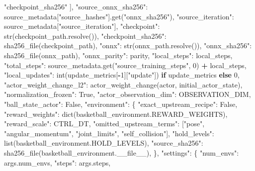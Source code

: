 \documentclass[
  chinese,
  11pt,
  letterpaper,
]{article}
\newenvironment{Shaded}{\begin{snugshade}}{\end{snugshade}}
\newcommand{\BuiltInTok}[1]{#1}
\newcommand{\ControlFlowTok}[1]{\textcolor[rgb]{0.13,0.29,0.53}{\textbf{#1}}}
\newcommand{\DecValTok}[1]{\textcolor[rgb]{0.00,0.00,0.81}{#1}}
\newcommand{\NormalTok}[1]{#1}
\newcommand{\OperatorTok}[1]{\textcolor[rgb]{0.81,0.36,0.00}{\textbf{#1}}}
\newcommand{\StringTok}[1]{\textcolor[rgb]{0.31,0.60,0.02}{#1}}
\newcommand{\VariableTok}[1]{\textcolor[rgb]{0.00,0.00,0.00}{#1}}
\renewenvironment{Shaded}{\par\smallskip}{\par\smallskip}
\begin{document}
\begin{Shaded}
\begin{Highlighting}[]
            \StringTok{"checkpoint\_sha256"}
\NormalTok{        ],}
        \StringTok{"source\_onnx\_sha256"}\NormalTok{: source\_metadata[}\StringTok{"source\_hashes"}\NormalTok{].get(}\StringTok{"onnx\_sha256"}\NormalTok{),}
        \StringTok{"source\_iteration"}\NormalTok{: source\_metadata[}\StringTok{"source\_iteration"}\NormalTok{],}
        \StringTok{"checkpoint"}\NormalTok{: }\BuiltInTok{str}\NormalTok{(checkpoint\_path.resolve()),}
        \StringTok{"checkpoint\_sha256"}\NormalTok{: sha256\_file(checkpoint\_path),}
        \StringTok{"onnx"}\NormalTok{: }\BuiltInTok{str}\NormalTok{(onnx\_path.resolve()),}
        \StringTok{"onnx\_sha256"}\NormalTok{: sha256\_file(onnx\_path),}
        \StringTok{"onnx\_parity"}\NormalTok{: parity,}
        \StringTok{"local\_steps"}\NormalTok{: local\_steps,}
        \StringTok{"total\_steps"}\NormalTok{: source\_metadata.get(}\StringTok{"source\_training\_steps"}\NormalTok{, }\DecValTok{0}\NormalTok{) }\OperatorTok{+}\NormalTok{ local\_steps,}
        \StringTok{"local\_updates"}\NormalTok{: }\BuiltInTok{int}\NormalTok{(update\_metrics[}\OperatorTok{{-}}\DecValTok{1}\NormalTok{][}\StringTok{"update"}\NormalTok{]) }\ControlFlowTok{if}\NormalTok{ update\_metrics }\ControlFlowTok{else} \DecValTok{0}\NormalTok{,}
        \StringTok{"actor\_weight\_change\_l2"}\NormalTok{: actor\_weight\_change(actor, initial\_actor\_state),}
        \StringTok{"normalization\_frozen"}\NormalTok{: }\VariableTok{True}\NormalTok{,}
        \StringTok{"actor\_observation\_dim"}\NormalTok{: OBSERVATION\_DIM,}
        \StringTok{"ball\_state\_actor"}\NormalTok{: }\VariableTok{False}\NormalTok{,}
        \StringTok{"environment"}\NormalTok{: \{}
            \StringTok{"exact\_upstream\_recipe"}\NormalTok{: }\VariableTok{False}\NormalTok{,}
            \StringTok{"reward\_weights"}\NormalTok{: }\BuiltInTok{dict}\NormalTok{(basketball\_environment.REWARD\_WEIGHTS),}
            \StringTok{"reward\_scale"}\NormalTok{: CTRL\_DT,}
            \StringTok{"omitted\_upstream\_terms"}\NormalTok{: [}\StringTok{"pose"}\NormalTok{, }\StringTok{"angular\_momentum"}\NormalTok{, }\StringTok{"joint\_limits"}\NormalTok{, }\StringTok{"self\_collision"}\NormalTok{],}
            \StringTok{"hold\_levels"}\NormalTok{: }\BuiltInTok{list}\NormalTok{(basketball\_environment.HOLD\_LEVELS),}
            \StringTok{"source\_sha256"}\NormalTok{: sha256\_file(basketball\_environment.}\VariableTok{\_\_file\_\_}\NormalTok{),}
\NormalTok{        \},}
        \StringTok{"settings"}\NormalTok{: \{}
            \StringTok{"num\_envs"}\NormalTok{: args.num\_envs,}
            \StringTok{"steps"}\NormalTok{: args.steps,}

\end{Highlighting}
\end{Shaded}
\end{document}
